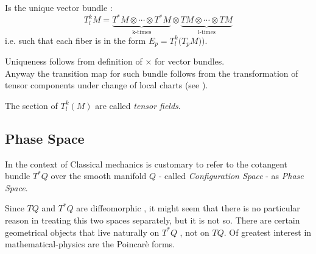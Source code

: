 \documentclass[a4paper,12pt]{scrartcl}    %
\begin{document}
\begin{definition}
Is the unique vector bundle :
	\begin{displaymath}
		T^k_l M = \underbrace{T^*M \otimes \cdots \otimes T^*M}_{\textrm{k-times}} \otimes \underbrace{TM \otimes \cdots \otimes TM}_{\textrm{l-times}}
	\end{displaymath}
i.e. such that each fiber is in the form $E_p = T^k_l \big(T_p M) \big) $.	
\end{definition}

\begin{observation}
	Uniqueness follows from definition of $\times$ for vector bundles.
	\\
	Anyway the transition map for such bundle follows from the transformation of tensor components under change of local charts (see \cite{abate}).
\end{observation}

\begin{notationfix}
	The section of $T^k_l(M)$ are called \emph{tensor fields}.
\end{notationfix}

\subsection{Phase Space}

	\begin{notationfix}
In the context of Classical mechanics is customary to refer to the cotangent bundle $T^*Q$ over the smooth manifold  $Q $ - called \emph{Configuration Space}  - as \emph{Phase Space}.
	\end{notationfix}
	Since $TQ$ and $T^*Q$ are diffeomorphic , it might seem that there is no particular reason in treating this two spaces separately, but it is not so.
	There are certain geometrical objects that live naturally on $T^*Q$ , not on $TQ$.
	Of greatest interest in mathematical-physics are the Poincarè forms\cite{Fraenkel}.
	
\end{document}
